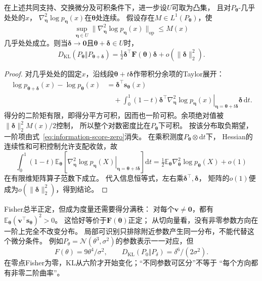 \begin{theorem}[KL的局部二阶展开]
\label{thm:information-kl-local-fisher}
在上述共同支持、交换微分及可积条件下，进一步设\(U\)可取为凸集，
且对\(P_{\bm\theta}\)-几乎处处的\(x\)，
\(\nabla^2_{\bm\eta}\log p_{\bm\eta}(x)\)在\(\bm\theta\)处连续。
假设存在\(M\in L^1(P_{\bm\theta})\)，使
\[
  \sup_{\bm\eta\in U}
  \|\nabla^2_{\bm\eta}\log p_{\bm\eta}(x)\|_{\mathrm{op}}\leq M(x)
\]
几乎处处成立。则当\(\bm\delta\to\bm0\)且\(\bm\theta+\bm\delta\in U\)时，
\begin{equation}
  D_{\mathrm{KL}}(P_{\bm\theta}\Vert P_{\bm\theta+\bm\delta})
  =\tfrac12\bm\delta^\top\bm F(\bm\theta)\bm\delta
   +o(\|\bm\delta\|_2^2).
  \label{eq:information-kl-fisher-expansion}
\end{equation}
\end{theorem}
\begin{proof}
对几乎处处的固定\(x\)，沿线段\(\bm\theta+t\bm\delta\)作带积分余项的Taylor展开：
\[
\begin{aligned}
  \log p_{\bm\theta+\bm\delta}(x)-\log p_{\bm\theta}(x)
  &=\bm\delta^\top\bm s_{\bm\theta}(x)\\
  &\quad+\int_0^1(1-t)\bm\delta^\top
  \left.\nabla^2_{\bm\eta}\log p_{\bm\eta}(x)
  \right|_{\bm\eta=\bm\theta+t\bm\delta}
  \bm\delta\,\mathrm dt.
\end{aligned}
\]
得分的二阶矩有限，即得分平方可积，因而也一阶可积。余项绝对值被
\(\|\bm\delta\|_2^2M(x)/2\)控制，
所以整个对数密度比在\(P_{\bm\theta}\)下可积。
按该分布取负期望，一阶项由式~\eqref{eq:information-score-zero}消失。
在乘积测度\(P_{\bm\theta}\otimes\mathrm dt\)下，
Hessian的连续性和可积控制允许支配收敛，故
\[
  \int_0^1(1-t)\mathbb E_{\bm\theta}
  \left[
    \left.\nabla^2_{\bm\eta}\log p_{\bm\eta}(X)
    \right|_{\bm\eta=\bm\theta+t\bm\delta}
  \right]\mathrm dt
  =\tfrac12\mathbb E_{\bm\theta}\nabla^2_{\bm\theta}
    \log p_{\bm\theta}(X)+o(1)
\]
在有限维矩阵算子范数下成立。
代入信息恒等式，左右乘\(\bm\delta^\top,\bm\delta\)，
矩阵的\(o(1)\)便成为\(o(\|\bm\delta\|_2^2)\)，得到结论。
\end{proof}

Fisher总半正定，但成为度量还需要得分满秩：
对每个\(\bm v\neq\bm0\)，都有
\(\mathbb E_{\bm\theta}(\bm v^\top\bm s_{\bm\theta})^2>0\)。
这恰好等价于\(\bm F(\bm\theta)\)正定；
从切向量看，没有非零参数方向在一阶上完全不改变分布。
局部可识别只排除附近参数产生同一分布，不能代替这个微分条件。
例如\(P_\theta=\mathcal N(\theta^3,\sigma^2)\)的参数表示一一对应，但
\[
  F(\theta)=9\theta^4/\sigma^2,\qquad
  D_{\mathrm{KL}}(P_0\Vert P_\delta)=\delta^6/(2\sigma^2).
\]
在零点Fisher为零，KL从六阶才开始变化；“不同参数可区分”不等于
“每个方向都有非零二阶曲率”。

